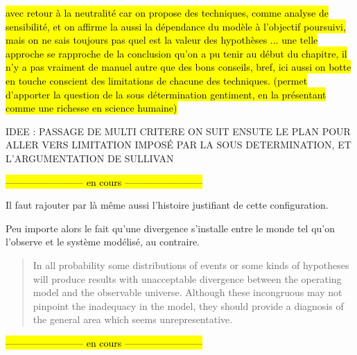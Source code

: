 



\hl{ avec retour à la neutralité car on propose des techniques, comme analyse de sensibilité, et on affirme la aussi la dépendance du modèle à l'objectif poursuivi, mais on ne sais toujours pas quel est la valeur des hypothèses ... une telle approche se rapproche de la conclusion qu'on a pu tenir au début du chapitre, il n'y a pas vraiment de manuel autre que des bons conseils, bref, ici aussi on botte en touche conscient des limitations de chacune des techniques. (permet d'apporter la question de la sous détermination gentiment, en la présentant comme une richesse en science humaine)}


IDEE : PASSAGE DE MULTI CRITERE ON SUIT ENSUTE LE PLAN POUR ALLER VERS LIMITATION IMPOSÉ PAR LA SOUS DETERMINATION, ET L'ARGUMENTATION DE SULLIVAN

\hl{------------------------ en cours ------------------------}

Il faut rajouter par là même aussi l'histoire justifiant de cette configuration. 

Peu importe alors le fait qu'une divergence s'installe entre le monde tel qu'on l'observe et le système modélisé, au contraire.

\foreignblockquote{english}[{\cite[226]{Hermann1967}}]{In all probability some distributions of events or some kinds of hypotheses will produce results with unacceptable divergence between the operating model and the observable universe. Although these incongruous may not pinpoint the inadequacy in the model, they should provide a diagnosis of the general area which seems unrepresentative.} 


\hl{------------------------ en cours ------------------------}



